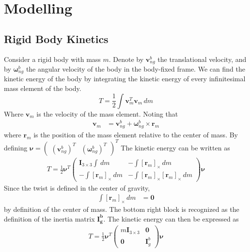 \chapter{Modelling}

\section{Rigid Body Kinetics}

Consider a rigid body with mass $m$. Denote by $\bm{v}_{ng}^b$ the translational
velocity, and by $\bm{\omega}_{ng}^b$ the angular velocity of the body in the
body-fixed frame. We can find the kinetic energy of the body by integrating the
kinetic energy of every infinitesimal mass element of the body.
\begin{equation}
    T = \frac{1}{2} \int \bm{v}_m^T \bm{v}_m\, dm
\end{equation}
Where $\bm{v}_m$ is the velocity of the mass element. Noting that
\begin{align}
    \bm{v}_m &= \bm{v}_{ng}^b + \bm{\omega}_{ng}^b \times \bm{r}_m
\end{align}
where $\bm{r}_m$ is the position of the mass element relative to the center of
mass. By defining $\bm{\nu} = \begin{pmatrix}(\bm{v}_{ng}^b)^T & (\bm{\omega}_{ng}^b)^T \end{pmatrix}^T$ The kinetic energy can be written as
\begin{align}
    T = \frac{1}{2} \bm{\nu}^T
    \begin{pmatrix}
        \bm{I}_{3\times 3} \int \,dm & - \int [\bm{r}_m]_\times \,dm \\
        - \int [\bm{r}_m]_\times \,dm & -\int [\bm{r}_m]_\times [\bm{r}_m]_\times \,dm
    \end{pmatrix}
    \bm{\nu}
\end{align}
Since the twist is defined in the center of gravity,
\begin{align}
    \int [\bm{r}_m]_{\times} \,dm &= \bm{0}
\end{align}
by definition of the center of mass. The bottom right block is recognized as the
definition of the inertia matrix $\bm{I_g^b}$. The kinetic energy can then be
expressed as
\begin{align}
    T = \frac{1}{2} \bm{\nu}^T \begin{pmatrix} m\bm{I}_{3\times 3} & \bm{0} \\ \bm{0} & \bm{I}_g^b \end{pmatrix} \bm{\nu}
\end{align}
